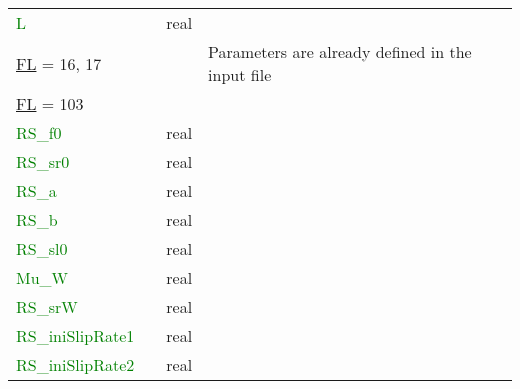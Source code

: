 \documentclass[12pt,twoside]{article}
\begin{document}
\begin{table}[H]
\begin{center}
\begin{tabular}{|p{4.8cm}|p{2.4cm}|p{2cm}|p{5cm}|}
\textcolor{green}{L} & & real & \\
\hdashline
\uline{FL} = 16, 17 & & & Parameters are already defined in the input file\\
\hdashline
\uline{FL} = 103 & & &\\
\textcolor{green}{RS\_f0} & & real & \\
\textcolor{green}{RS\_sr0} & & real & \\
\textcolor{green}{RS\_a} & & real & \\
\textcolor{green}{RS\_b} & & real & \\
\textcolor{green}{RS\_sl0} & & real & \\
\textcolor{green}{Mu\_W} & & real & \\
\textcolor{green}{RS\_srW} & & real & \\
\textcolor{green}{RS\_iniSlipRate1} & & real & \\
\textcolor{green}{RS\_iniSlipRate2} & & real & \\
\hline
\end{tabular}
\end{center}
\label{fl-table}
\end{table}

\newpage
\end{document}
